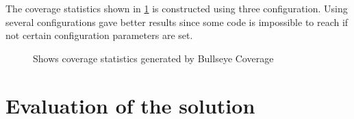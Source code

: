 The coverage statistics shown in \ref{FIG:BULLSEYE} is constructed
using three configuration. Using several configurations gave better results since
some code is impossible to reach if not certain configuration parameters are set.

\begin{figure}[!ht]
  \setlength\fboxsep{0pt}
  \setlength\fboxrule{0.5pt}
  \caption{Shows coverage statistics generated by Bullseye Coverage}
  \label{FIG:BULLSEYE}
\end{figure}


\section{Evaluation of the solution}

